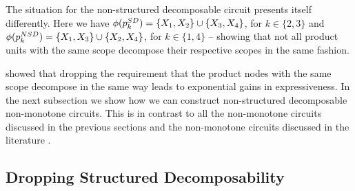 The situation for the non-structured decomposable circuit presents itself differently. Here we have $\phi(p_{k}^{SD}) =  \{X_1,X_2\} \cup \{X_3,X_4 \}$, for $k \in \{2,3\}$ and $\phi(p_{k}^{NSD}) =  \{X_1,X_3\} \cup \{X_2,X_4 \}$, for $k \in \{1,4 \}$ -- showing that not all product units with the same scope decompose their respective scopes in the same fashion.

\citet{pipatsrisawat2008new} showed that dropping the requirement that the product nodes with the same scope decompose in the same way leads to exponential gains in expressiveness. In the next subsection we show how we can construct non-structured decomposable non-monotone circuits. This is in contrast to all the non-monotone circuits discussed in the previous sections and the non-monotone circuits discussed in the literature \citep{sladek2023encoding,loconte2025sum,loconte2024subtractive,wangrelationship}.




















\subsection{Dropping Structured Decomposability}
\label{sec:nonstructdecomp}











